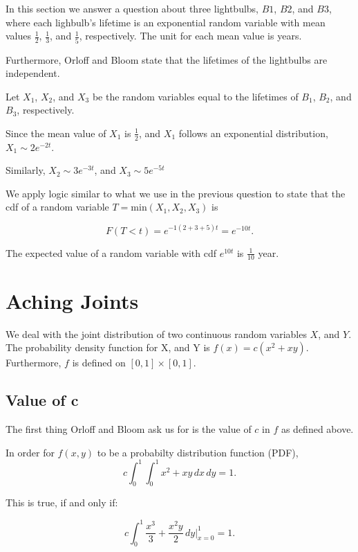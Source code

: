 \documentclass[a5paper,11pt]{article}
\begin{document}
In this section we answer a question about three lightbulbs, $B1$, $B2$, and
$B3$, where each lighbulb's lifetime is an exponential random variable with
mean values $\frac{1}{2}$, $\frac{1}{3}$, and $\frac{1}{5}$, respectively.
The unit for each mean value is years.

Furthermore, Orloff and Bloom state that the lifetimes of the lightbulbs are
independent.


Let $X_1$, $X_2$, and $X_3$ be the random variables equal to the lifetimes
of $B_1$, $B_2$, and $B_3$, respectively.

Since the mean value of $X_1$ is $\frac{1}{2}$, and $X_1$
follows an exponential distribution,  $X_1 \sim 2e^{-2t}$.

Similarly, $X_2 \sim 3e^{-3t}$, and $X_3 \sim 5e^{-5t}$


We apply logic similar to what we use in the previous question to state
that the cdf of a random variable $T=\text{min}\left(X_1, X_2, X_3 \right)$
is 

\begin{equation}
F\left(T < t \right) = 
	e^{-1 \left(2+ 3 + 5\right) t }
   = e^{-10t}.
\end{equation}

The expected value of a random variable with cdf $e^{10t}$
is $\frac{1}{10}$ year.

\section{Aching Joints}

We deal with the joint distribution of two
continuous random variables $X$, and $Y$.
The probability density function for X, 
and Y is $f\left(x \right) = 
c\left(x^2+xy \right)$. 
Furthermore, $f$ is defined on 
$\left[0,1 \right] \times 
\left[0,1 \right]$.

\subsection{Value of c}
The first thing Orloff and Bloom ask us for
is the value of $c$ in $f$ as defined
above.

In order for $f \left(x, y \right)$ to be a
probabilty distribution function (PDF),
\begin{equation}
c \int_0^1 \int_0^1 x^2 + xy \,dx \,dy
= 1.
\end{equation} 

This is true, if and only if:

\begin{equation}
c \int_0^1 \frac{x^3}{3} + \frac{x^2y}{2} 
\,dy \bigg\rvert_{x=0}^1
= 1.
\end{equation} 
\end{document}
